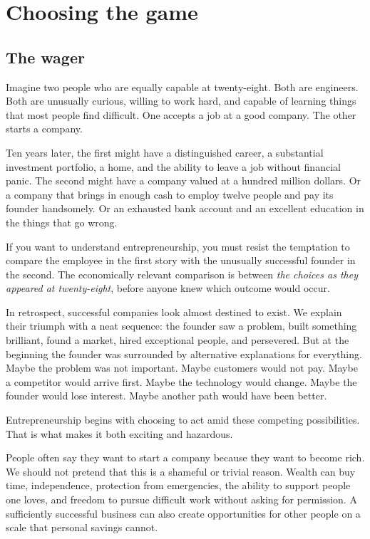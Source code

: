 \documentclass[11pt,twoside,openright]{book}
\begin{document}
\BIFrontMatter
\chapter{Choosing the game}
\section{The wager}
Imagine two people who are equally capable at twenty-eight. Both are engineers. Both are unusually curious, willing to work hard, and capable of learning things that most people find difficult. One accepts a job at a good company. The other starts a company.

Ten years later, the first might have a distinguished career, a substantial investment portfolio, a home, and the ability to leave a job without financial panic. The second might have a company valued at a hundred million dollars. Or a company that brings in enough cash to employ twelve people and pay its founder handsomely. Or an exhausted bank account and an excellent education in the things that go wrong.

If you want to understand entrepreneurship, you must resist the temptation to compare the employee in the first story with the unusually successful founder in the second. The economically relevant comparison is between \emph{the choices as they appeared at twenty-eight}, before anyone knew which outcome would occur.

In retrospect, successful companies look almost destined to exist. We explain their triumph with a neat sequence: the founder saw a problem, built something brilliant, found a market, hired exceptional people, and persevered. But at the beginning the founder was surrounded by alternative explanations for everything. Maybe the problem was not important. Maybe customers would not pay. Maybe a competitor would arrive first. Maybe the technology would change. Maybe the founder would lose interest. Maybe another path would have been better.

Entrepreneurship begins with choosing to act amid these competing possibilities. That is what makes it both exciting and hazardous.

People often say they want to start a company because they want to become rich. We should not pretend that this is a shameful or trivial reason. Wealth can buy time, independence, protection from emergencies, the ability to support people one loves, and freedom to pursue difficult work without asking for permission. A sufficiently successful business can also create opportunities for other people on a scale that personal savings cannot.
\end{document}
